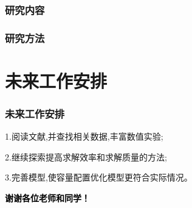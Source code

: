 \documentclass{beamer}
\begin{document}
\begin{frame}
	\frametitle{研究内容} 
	
\end{frame}

\begin{frame}
	\frametitle{研究方法} 

\end{frame}

\section{未来工作安排}
\begin{frame}
	\frametitle{未来工作安排} 
	1.阅读文献,并查找相关数据,丰富数值实验;

	2.继续探索提高求解效率和求解质量的方法;

	3.完善模型,使容量配置优化模型更符合实际情况。
\end{frame}



\begin{frame}
\vspace{1em}
\centering
\textcolor{black}{\LARGE\bf 谢谢各位老师和同学！}

\end{frame}
\end{document}
